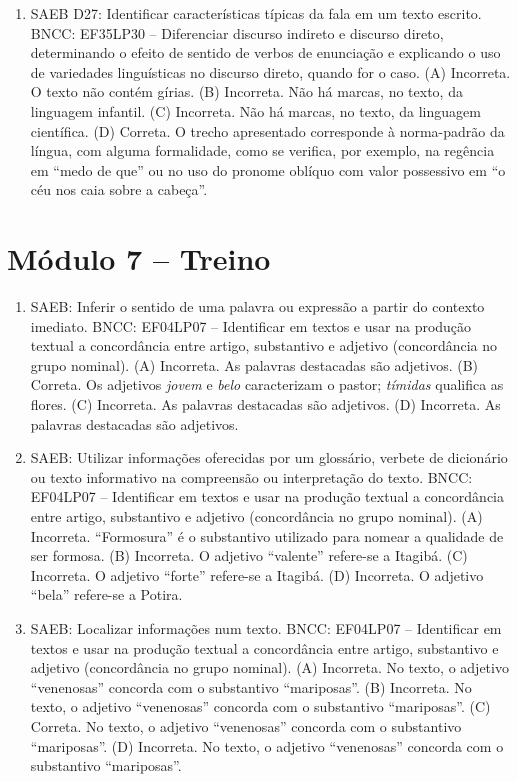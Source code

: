 \begin{enumerate}
\item
SAEB D27: Identificar características típicas da fala em um texto
escrito.
BNCC: EF35LP30 -- Diferenciar discurso indireto e discurso direto,
determinando o efeito de sentido de verbos de enunciação e explicando o
uso de variedades linguísticas no discurso direto, quando for o caso.
(A)  Incorreta. O texto não contém gírias.
(B)  Incorreta. Não há marcas, no texto, da linguagem infantil.
(C)  Incorreta. Não há marcas, no texto, da linguagem científica.
(D)  Correta. O trecho apresentado corresponde à norma-padrão da língua, 
com alguma formalidade, como se verifica, por exemplo, na regência em
``medo de que'' ou no uso do pronome oblíquo com valor possessivo em 
``o céu nos caia sobre a cabeça''.
\end{enumerate}

\section*{Módulo 7 – Treino}

\begin{enumerate}
\item
SAEB: Inferir o sentido de uma palavra ou expressão a partir do
contexto imediato.
BNCC: EF04LP07 -- Identificar em textos e usar na produção textual a
concordância entre artigo, substantivo e adjetivo (concordância no grupo
nominal).
(A)  Incorreta. As palavras destacadas são adjetivos.
(B)  Correta. Os adjetivos \textit{jovem} e \textit{belo} caracterizam o
pastor; \textit{tímidas} qualifica as flores.
(C)  Incorreta. As palavras destacadas são adjetivos.
(D)  Incorreta. As palavras destacadas são adjetivos.

\item
SAEB: Utilizar informações oferecidas por um glossário, verbete de
dicionário ou texto informativo na compreensão ou interpretação do
texto.
BNCC: EF04LP07 -- Identificar em textos e usar na produção textual a
concordância entre artigo, substantivo e adjetivo (concordância no grupo
nominal).
(A) Incorreta. ``Formosura'' é o substantivo utilizado para nomear a qualidade
de ser formosa.
(B) Incorreta. O adjetivo ``valente'' refere-se a Itagibá.
(C)  Incorreta. O adjetivo ``forte'' refere-se a Itagibá.
(D)  Incorreta. O adjetivo ``bela'' refere-se a Potira.

\item
SAEB: Localizar informações num texto.
BNCC: EF04LP07 -- Identificar em textos e usar na produção textual a
concordância entre artigo, substantivo e adjetivo (concordância no grupo
nominal).
(A) Incorreta. No texto, o adjetivo ``venenosas'' concorda com o substantivo ``mariposas''.
(B) Incorreta. No texto, o adjetivo ``venenosas'' concorda com o substantivo ``mariposas''.
(C) Correta. No texto, o adjetivo ``venenosas'' concorda com o substantivo ``mariposas''.
(D) Incorreta. No texto, o adjetivo ``venenosas'' concorda com o substantivo ``mariposas''.
\end{enumerate}

